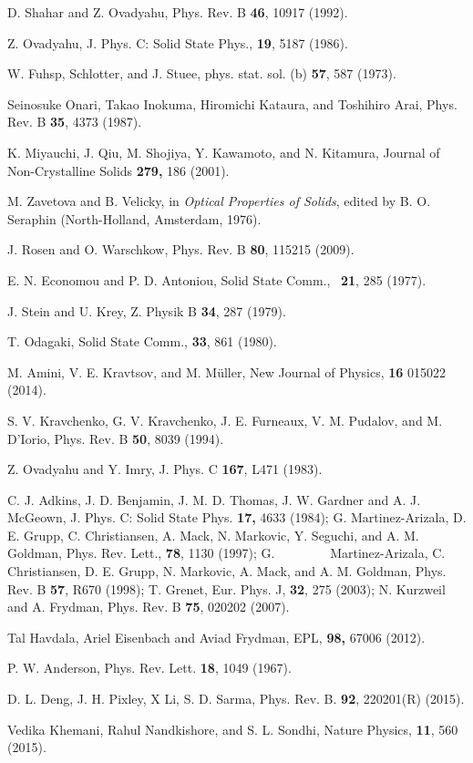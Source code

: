 \documentclass
[preprint,showpacs,byrevtex,10pt,twocolumn,tightenlines,prl,letterpaper]{revtex4}%
\begin{document}
\begin{thebibliography}{99}
D. Shahar and Z. Ovadyahu, Phys. Rev. B \textbf{46}, 10917 (1992).

Z. Ovadyahu, J. Phys. C: Solid State Phys., \textbf{19}, 5187 (1986).

W. Fuhsp, Schlotter, and J. Stuee, phys. stat. sol. (b)
\textbf{57}, 587 (1973).

Seinosuke Onari, Takao Inokuma, Hiromichi Kataura, and Toshihiro
Arai, Phys. Rev. B \textbf{35}, 4373 (1987).

K. Miyauchi, J. Qiu, M. Shojiya, Y. Kawamoto, and N. Kitamura,
Journal of Non-Crystalline Solids \textbf{279,} 186 (2001).

M. Zavetova and B. Velicky, in \textit{Optical Properties of
Solids}, edited by B. O. Seraphin (North-Holland, Amsterdam, 1976).

J. Rosen and O. Warschkow, Phys. Rev. B \textbf{80}, 115215 (2009).

E. N. Economou and P. D. Antoniou, Solid State Comm.,
\ \textbf{21}, 285 (1977).

J. Stein and U. Krey, Z. Physik B \textbf{34}, 287 (1979).

T. Odagaki, Solid State Comm., \textbf{33}, 861 (1980).

M. Amini, V. E. Kravtsov, and M. M\"{u}ller, New Journal of
Physics, \textbf{16} 015022 (2014).

S. V. Kravchenko, G. V. Kravchenko, J. E. Furneaux, V. M.
Pudalov, and M. D'Iorio, Phys. Rev. B \textbf{50}, 8039 (1994).

Z. Ovadyahu and Y. Imry, J. Phys. C \textbf{167}, L471 (1983).

C. J. Adkins, J. D. Benjamin, J. M. D. Thomas, J. W. Gardner and
A. J. McGeown, J. Phys. C: Solid State Phys. \textbf{17,} 4633 (1984); G.
Martinez-Arizala, D. E. Grupp, C. Christiansen, A. Mack, N. Markovic, Y.
Seguchi, and A. M. Goldman, Phys. Rev. Lett., \textbf{78}, 1130 (1997); G.
\ \ \ \ \ \ ~~Martinez-Arizala, C. Christiansen, D. E. Grupp, N. Markovic, A.
Mack, and A. M. Goldman, Phys. Rev. B\textbf{ 57}, R670 (1998); T. Grenet,
Eur. Phys. J, \textbf{32}, 275 (2003); N. Kurzweil and A. Frydman, Phys. Rev.
B \textbf{75}, 020202 (2007).

Tal Havdala, Ariel Eisenbach and Aviad Frydman, EPL, \textbf{98,
}67006 (2012).

P. W. Anderson, Phys. Rev. Lett. \textbf{18}, 1049 (1967).

D. L. Deng, J. H. Pixley, X Li, S. D. Sarma, Phys. Rev. B.
\textbf{92}, 220201(R) (2015).

Vedika Khemani, Rahul Nandkishore, and S. L. Sondhi, Nature
Physics, \textbf{11}, 560 (2015).
\end{thebibliography}
\end{document}
